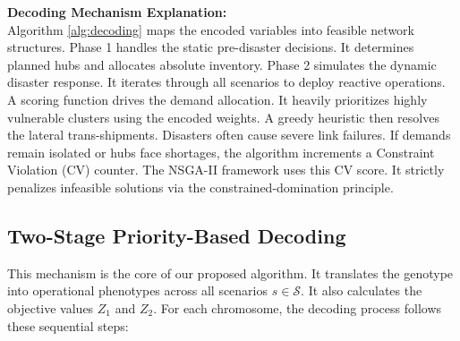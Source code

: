 \documentclass{llncs}
\begin{document}
{\noindent \textbf{Decoding Mechanism Explanation:} \\
Algorithm \ref{alg:decoding} maps the encoded variables into feasible network structures. Phase 1 handles the static pre-disaster decisions. It determines planned hubs and allocates absolute inventory. Phase 2 simulates the dynamic disaster response. It iterates through all scenarios to deploy reactive operations. A scoring function drives the demand allocation. It heavily prioritizes highly vulnerable clusters using the encoded weights. A greedy heuristic then resolves the lateral trans-shipments. Disasters often cause severe link failures. If demands remain isolated or hubs face shortages, the algorithm increments a Constraint Violation (CV) counter. The NSGA-II framework uses this CV score. It strictly penalizes infeasible solutions via the constrained-domination principle.



\subsection{Two-Stage Priority-Based Decoding}
This mechanism is the core of our proposed algorithm. It translates the genotype into operational phenotypes across all scenarios $s \in \mathcal{S}$. It also calculates the objective values $Z_1$ and $Z_2$. For each chromosome, the decoding process follows these sequential steps:

}
\end{document}
